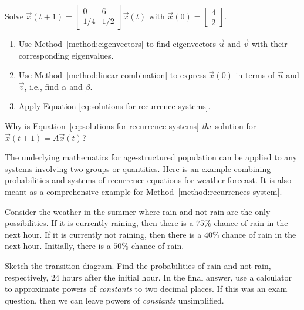 \documentclass[../main.tex]{subfiles}
\begin{document}
\begin{example} \label{eq:age-structured-recurrence-solution}
  Solve \( \vec{x}(t+1) = \begin{bmatrix} 0 & 6 \\ 1/4 & 1/2 \end{bmatrix} \vec{x}(t) \) with \(\vec{x}(0) = \begin{bmatrix} 4 \\ 2 \end{bmatrix}\).

  \begin{enumerate}[wide, label=(Step~\arabic*)]
    \item Use Method~\ref{method:eigenvectors} to find eigenvectors \(\vec{u}\) and \(\vec{v}\) with their corresponding eigenvalues. 


    \item Use Method~\ref{method:linear-combination} to express \(\vec{x}(0)\) in terms of \(\vec{u}\) and \(\vec{v}\), i.e., find \(\alpha\) and \(\beta\).


    \item Apply Equation \eqref{eq:solutions-for-recurrence-systems}. 

      \blanks*
  \end{enumerate}
\end{example}
\clearpage

Why is Equation~\eqref{eq:solutions-for-recurrence-systems} \emph{the} solution for \(\vec{x}(t+1) = A \vec{x}(t)\)? 


The underlying mathematics for age-structured population can be applied to any systems involving two groups or quantities. Here is an example combining probabilities and systems of recurrence equations for weather forecast. It is also meant as a comprehensive example for Method~\ref{method:recurrences-system}. 

\begin{example} \label{ex:weather-forecast}
  Consider the weather in the summer where rain and not rain are the only possibilities.  If it is currently raining, then there is a \(75\%\) chance of rain in the next hour. If it is currently not raining, then there is a \(40\%\) chance  of rain in the next hour.  Initially, there is a \(50\%\) chance of rain.

  Sketch the transition diagram. Find the probabilities of rain and not rain, respectively, \(24\) hours after the initial hour.  In the final answer, use a calculator to approximate powers of \emph{constants} to two decimal places. If this was an exam question, then we can leave powers of \emph{constants} unsimplified.

  \blanks*
  \clearpage

  \blanks*
  \clearpage

  \blanks*
  \clearpage
\end{example}
\end{document}
